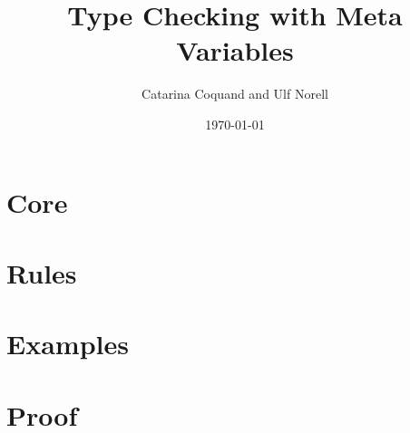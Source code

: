\documentclass[11pt]{article}
\title{Type Checking with Meta Variables}
\author{Catarina Coquand and Ulf Norell}
\date{\today}
\begin{document}
\maketitle

\section{Core} 

\section{Rules} 

\section{Examples} 

\section{Proof} 
\end{document}
